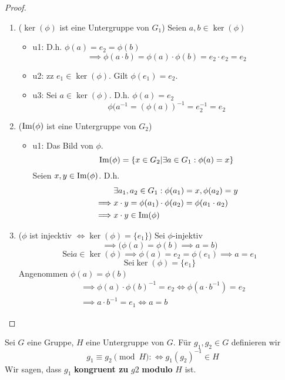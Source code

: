 \documentclass[../Algebra_script.tex]{subfiles}
\begin{document}
\begin{proof}
\begin{enumerate}
	\item{($\ker(\phi)$ ist eine Untergruppe von $G_1$)}
		Seien $a, b \in \ker(\phi)$
		\begin{itemize}
			\item{u1: } D.h. $\phi(a) = e_2 = \phi(b)$
				\[\implies \phi(a\cdot b) = \phi(a)\cdot \phi(b) = e_2 \cdot e_2 = e_2\]
			\item{u2: } zz $e_1 \in \ker(\phi)$. Gilt $\phi(e_1) = e_2$.
			\item{u3: } Sei $a \in \ker(\phi)$. D.h. $\phi(a) = e_2$
				\[\phi(a^{-1} = (\phi(a))^{-1} = e_2^{-1} = e_2\]
		\end{itemize}
	\item{($\operatorname{Im}(\phi)$ ist eine Untergruppe von $G_2$)}
		\begin{itemize}
			\item{u1: } Das Bild von $\phi$.
				\[\operatorname{Im}(\phi) = \{ x \in G_2 | \exists a \in G_1: \phi(a) = x\}\]
				Seien $x, y \in \operatorname{Im}(\phi)$. D.h.
				\[\begin{aligned}
					&\exists a_1, a_2 \in G_1 : \phi(a_1) = x, \phi(a_2) = y\\
					\implies &x\cdot y = \phi(a_1)\cdot \phi(a_2) = \phi(a_1 \cdot a_2)\\
					\implies &x\cdot y \in \operatorname{Im}(\phi)
				\end{aligned}\]
		\end{itemize}
	\item{($\phi$ ist injecktiv $\iff \ker(\phi) = \{e_1\}$)}
		Sei $\phi$-injektiv
		\[\implies \big(\phi(a) = \phi(b) \implies a = b \big)\]
		\[\text{Sei} a \in \ker(\phi) \implies \phi(a) = e_2 = \phi(e_1) \implies a = e_1\]
		\[\text{Sei} \ker(\phi) = \{e_1\}\]
		Angenommen $\phi(a) = \phi(b)$
		\[\begin{aligned}
			&\implies \phi(a)\cdot \phi(b)^{-1} = e_2 \iff \phi(a \cdot b^{-1}) = e_2\\
			&\implies a\cdot b^{-1} = e_1 \iff a = b
		\end{aligned}\]
\end{enumerate}
\end{proof}

\begin{remark}
	Sei $G$ eine Gruppe, $H$ eine Untergruppe von $G$. Für $g_1, g_2 \in G$ definieren wir
	\[g_1 \equiv g_2 \pmod H : \iff g_1(g_2)^{-1} \in H\]
	Wir sagen, dass $g_1$ \textbf{kongruent zu} $g2$ \textbf{modulo} $H$ ist.
\end{remark}
\end{document}

